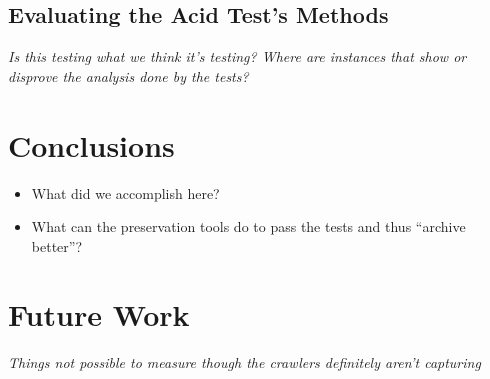 \documentclass{acm_proc}
\newcommand{\todo}[1]{{\textit{\color{red}#1}}}
\begin{document}
\subsection{Evaluating the Acid Test's Methods}
\todo{Is this testing what we think it's testing? Where are instances that show or disprove the analysis done by the tests?\\}

\section{Conclusions}
\begin{itemize}
\item What did we accomplish here?
\item What can the preservation tools do to pass the tests and thus ``archive better''?
\end{itemize}

\section{Future Work}
\todo{Things not possible to measure though the crawlers definitely aren't capturing}


  
\end{document}
